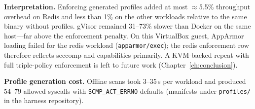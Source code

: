 \begin{table}[ht]
\centering
\caption{Measured median throughput and overhead (campaign \texttt{20260616-193735}). Enforcement rows compare \texttt{proposed} to \texttt{stock}; sandbox rows compare \texttt{gvisor} to \texttt{docker}.}
\label{tab:perf-ch5}
\end{table}

\textbf{Interpretation.} Enforcing generated profiles added at most $\approx$5.5\% throughput overhead on Redis and less than 1\% on the other workloads relative to the same binary without profiles. gVisor remained 31--73\% slower than Docker on the same host---far above the enforcement penalty. On this VirtualBox guest, AppArmor loading failed for the redis workload (\texttt{apparmor/exec}); the redis enforcement row therefore reflects seccomp and capabilities primarily. A KVM-backed repeat with full triple-policy enforcement is left to future work (Chapter~\ref{ch:conclusion}).

\textbf{Profile generation cost.} Offline scans took 3--35\,s per workload and produced 54--79 allowed syscalls with \texttt{SCMP\_ACT\_ERRNO} defaults (manifests under \texttt{profiles/} in the harness repository).
